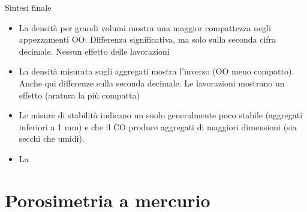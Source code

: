 \documentclass[10pt]{beamer}
\begin{document}


\begin{frame}{Sintesi finale}
  \begin{itemize}[<+->]
  \item La densit\`a per grandi volumi mostra una maggior compattezza
    negli appezzamenti OO. Differenza significativa, ma solo sulla
    seconda cifra decimale. Nessun effetto delle lavorazioni
  \item La densit\`a misurata sugli aggregati mostra l'inverso (OO
    meno compatto). Anche qui differenze sulla seconda decimale. Le
    lavorazioni mostrano un effetto (aratura la pi\`u compatta)
  \item Le misure di stabilit\`a indicano un suolo generalmente poco
    stabile (aggregati inferiori a 1 mm) e che il CO produce aggregati
    di maggiori dimensioni (sia secchi che umidi).
  \item La 
  \end{itemize}

\end{frame}
\section{Porosimetria a mercurio}

\begin{frame}
\end{frame}

\appendix
\end{document}
